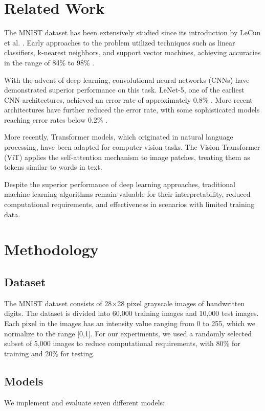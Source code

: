 \documentclass{article}
\begin{document}
\section{Related Work}
The MNIST dataset has been extensively studied since its introduction by LeCun et al. \cite{lecun1998gradient}. Early approaches to the problem utilized techniques such as linear classifiers, k-nearest neighbors, and support vector machines, achieving accuracies in the range of 84\% to 98\% \cite{lecun1998gradient}.

With the advent of deep learning, convolutional neural networks (CNNs) have demonstrated superior performance on this task. LeNet-5, one of the earliest CNN architectures, achieved an error rate of approximately 0.8\% \cite{lecun1998gradient}. More recent architectures have further reduced the error rate, with some sophisticated models reaching error rates below 0.2\% \cite{ciregan2012multi}.

More recently, Transformer models, which originated in natural language processing, have been adapted for computer vision tasks. The Vision Transformer (ViT) \cite{dosovitskiy2020image} applies the self-attention mechanism to image patches, treating them as tokens similar to words in text.

Despite the superior performance of deep learning approaches, traditional machine learning algorithms remain valuable for their interpretability, reduced computational requirements, and effectiveness in scenarios with limited training data.

\section{Methodology}

\subsection{Dataset}
The MNIST dataset consists of 28$\times$28 pixel grayscale images of handwritten digits. The dataset is divided into 60,000 training images and 10,000 test images. Each pixel in the images has an intensity value ranging from 0 to 255, which we normalize to the range [0,1]. For our experiments, we used a randomly selected subset of 5,000 images to reduce computational requirements, with 80\% for training and 20\% for testing.

\subsection{Models}
We implement and evaluate seven different models:
\end{document}
